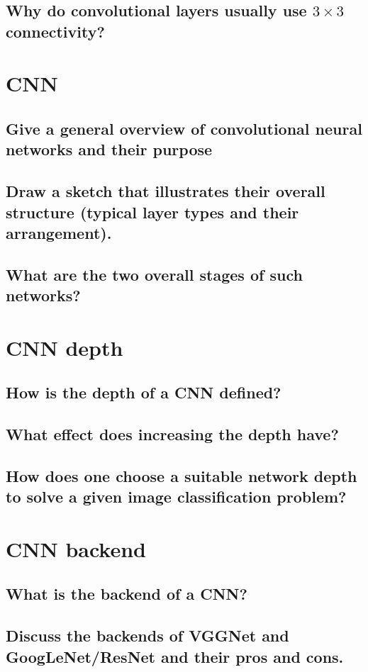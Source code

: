\subsection{Why do convolutional layers usually use $3 \times 3$ connectivity?}


\section{CNN}
\subsection{Give a general overview of convolutional neural networks and their purpose}
\subsection{Draw a sketch that illustrates their overall structure (typical layer types and their arrangement).}
\subsection{What are the two overall stages of such networks?}

\section{CNN depth}
\subsection{How is the depth of a CNN defined?}
\subsection{What effect does increasing the depth have?}
\subsection{How does one choose a suitable network depth to solve a given image classification problem?}

\section{CNN backend}
\subsection{What is the backend of a CNN?}
\subsection{Discuss the backends of VGGNet and GoogLeNet/ResNet and their pros and cons.}

